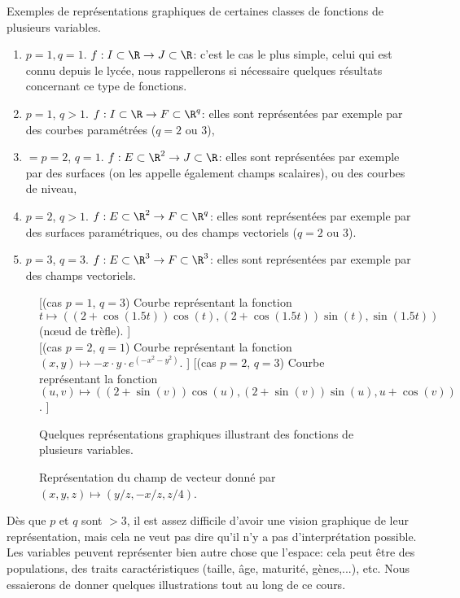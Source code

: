 \documentclass[class=report,crop=false]{standalone}
\begin{document}
\noindent Exemples de représentations graphiques de certaines classes de 
fonctions de plusieurs variables.
\begin{enumerate}
\item $p=1,q=1$.  $f: I \subset \R \rightarrow J \subset \R$:  c'est le cas le plus simple, celui qui est connu depuis le lycée, 
nous rappellerons si nécessaire quelques résultats concernant ce type de fonctions. 
\item $p=1$, $q >1$. $f: I \subset \R \rightarrow F \subset \R^q$: elles sont représentées par exemple par des courbes  paramétrées ($q=2$ ou $3$),
\item $=p=2$, $q = 1$. $f: E \subset \R^2 \rightarrow J \subset \R$: elles sont représentées par exemple par des surfaces (on les appelle également champs scalaires), ou des courbes de niveau,
\item $p=2$, $q >1$. $f: E \subset \R^2 \rightarrow F \subset \R^q$: elles sont représentées par exemple par des surfaces paramétriques, ou des champs vectoriels ($q=2$ ou $3$).
\item $p=3$, $q = 3$. $f: E \subset \R^3 \rightarrow F \subset \R^3$: elles sont représentées par exemple par des champs vectoriels.
\end{enumerate}
\begin{figure}[!h]
    \centering
    [\color{blue} (cas $p=q=1$) Courbe représentant la fonction $x \mapsto x \sin(x)$.]
    {
        \label{fig:courbe1}
    }
    [(cas $p=1$, $q=3$) Courbe représentant la fonction $ t \mapsto ((2+\cos(1.5t))\cos(t),  (2+\cos(1.5t))\sin(t),\sin(1.5t))$ (nœud de trèfle). ]
    {
        \label{fig:trefoil}
    }\\
    
     [(cas $p=2$, $q=1$) Courbe représentant la fonction $ (x,y) \mapsto -x\cdot y\cdot e^{\left( -x^{2}-y^{2} \right)}$. ]
    {
        \label{fig:courbe3D1}
    }
    [\color{blue}(cas $p=2$, $q=3$) Courbe représentant la fonction $ (u,v) \mapsto \left( (2+\sin(v))\cos(u), (2+\sin(v))\sin(u),u+\cos(v) \right)$. ]
    {
        \label{fig:courbe3D2}
    }
    \caption{Quelques représentations graphiques illustrant des fonctions de plusieurs variables.}
    \label{fig:courbes3D}
\end{figure}
\begin{figure}[!h]
    \caption{Représentation du champ de vecteur donné par 
  $(x,y,z) \mapsto (y / z,-x /  z,z / 4 )$.}
      \label{fig:vectorfield}
\end{figure}
Dès que $p$ et $q$ sont $>3$, il est assez difficile d'avoir une vision
graphique de leur représentation, mais cela ne veut pas dire qu'il n'y a pas 
d'interprétation possible. Les variables peuvent représenter bien autre chose
que l'espace: cela peut être des populations, des traits caractéristiques (taille, âge, maturité, gènes,...), etc. Nous essaierons de donner quelques illustrations tout au long de ce cours.
\end{document}
